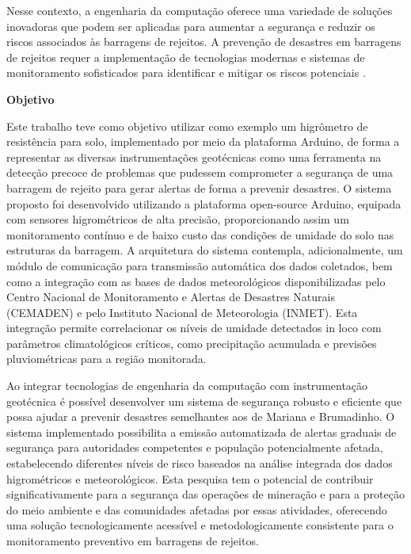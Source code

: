 Nesse contexto, a engenharia da computação oferece uma variedade de soluções inovadoras que podem ser aplicadas para aumentar a segurança e reduzir os riscos associados às barragens de rejeitos. A prevenção de desastres em barragens de rejeitos requer a implementação de tecnologias modernas e sistemas de monitoramento sofisticados para identificar e mitigar os riscos potenciais \cite{icmm2020global}.
    
\vspace{0.5cm}
\textbf{Objetivo}
\vspace{0.5cm}

Este trabalho teve como objetivo utilizar como exemplo um higrômetro de resistência para solo, implementado por meio da plataforma Arduino, de forma a representar as diversas instrumentações geotécnicas como uma ferramenta na detecção precoce de problemas que pudessem comprometer a segurança de uma barragem de rejeito para gerar alertas de forma a prevenir desastres. O sistema proposto foi desenvolvido utilizando a plataforma open-source Arduino, equipada com sensores higrométricos de alta precisão, proporcionando assim um monitoramento contínuo e de baixo custo das condições de umidade do solo nas estruturas da barragem. A arquitetura do sistema contempla, adicionalmente, um módulo de comunicação para transmissão automática dos dados coletados, bem como a integração com as bases de dados meteorológicos disponibilizadas pelo Centro Nacional de Monitoramento e Alertas de Desastres Naturais (CEMADEN) e pelo Instituto Nacional de Meteorologia (INMET). Esta integração permite correlacionar os níveis de umidade detectados in loco com parâmetros climatológicos críticos, como precipitação acumulada e previsões pluviométricas para a região monitorada.

Ao integrar tecnologias de engenharia da computação com instrumentação geotécnica é possível desenvolver um sistema de segurança robusto e eficiente que possa ajudar a prevenir desastres semelhantes aos de Mariana e Brumadinho. O sistema implementado possibilita a emissão automatizada de alertas graduais de segurança para autoridades competentes e população potencialmente afetada, estabelecendo diferentes níveis de risco baseados na análise integrada dos dados higrométricos e meteorológicos. Esta pesquisa tem o potencial de contribuir significativamente para a segurança das operações de mineração e para a proteção do meio ambiente e das comunidades afetadas por essas atividades, oferecendo uma solução tecnologicamente acessível e metodologicamente consistente para o monitoramento preventivo em barragens de rejeitos.


